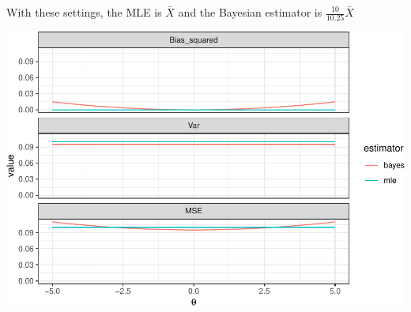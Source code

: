 \documentclass[]{article}
\begin{document}
With these settings, the MLE is \(\bar{X}\) and the Bayesian estimator
is \(\frac{10}{10.25} \bar{X}\)

\includegraphics{20190426_normal_univar_bayes_files/figure-latex/unnamed-chunk-3-1.pdf}
\end{document}
